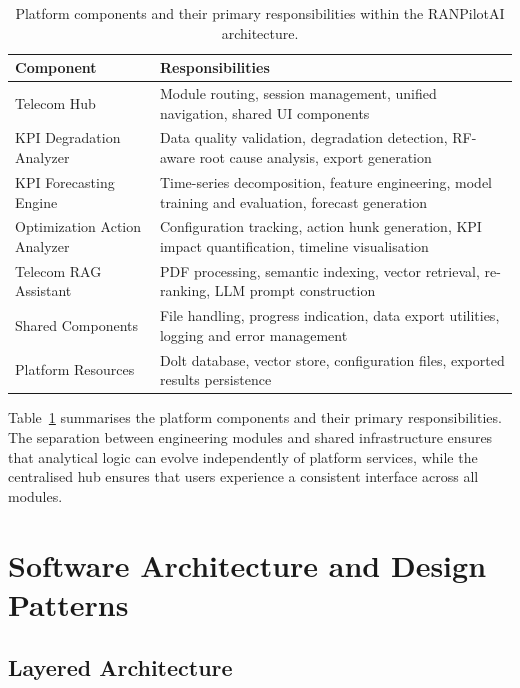 \begin{table}[H]
    \centering
    \caption{Platform components and their primary responsibilities within the RANPilotAI architecture.}
    \label{tab:platform_modules}
    \begin{tabular}{|p{3.5cm}|p{8cm}|}
        \hline
        \textbf{Component} & \textbf{Responsibilities} \\
        \hline
        Telecom Hub & Module routing, session management, unified navigation, shared UI components \\
        \hline
        KPI Degradation Analyzer & Data quality validation, degradation detection, RF-aware root cause analysis, export generation \\
        \hline
        KPI Forecasting Engine & Time-series decomposition, feature engineering, model training and evaluation, forecast generation \\
        \hline
        Optimization Action Analyzer & Configuration tracking, action hunk generation, KPI impact quantification, timeline visualisation \\
        \hline
        Telecom RAG Assistant & PDF processing, semantic indexing, vector retrieval, re-ranking, LLM prompt construction \\
        \hline
        Shared Components & File handling, progress indication, data export utilities, logging and error management \\
        \hline
        Platform Resources & Dolt database, vector store, configuration files, exported results persistence \\
        \hline
    \end{tabular}
\end{table}

Table~\ref{tab:platform_modules} summarises the platform components and their primary responsibilities. The separation between engineering modules and shared infrastructure ensures that analytical logic can evolve independently of platform services, while the centralised hub ensures that users experience a consistent interface across all modules.

\section{Software Architecture and Design Patterns}

\subsection{Layered Architecture}

